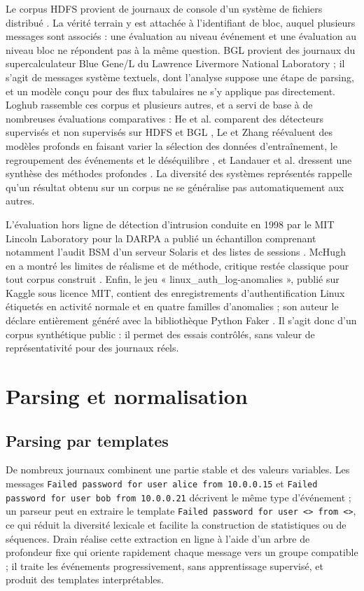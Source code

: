 Le corpus HDFS provient de journaux de console d'un système de fichiers distribué \cite{xu2009hdfs}. La vérité terrain y est attachée à l'identifiant de bloc, auquel plusieurs messages sont associés : une évaluation au niveau événement et une évaluation au niveau bloc ne répondent pas à la même question. BGL provient des journaux du supercalculateur Blue Gene/L du Lawrence Livermore National Laboratory \cite{oliner2007bgl} ; il s'agit de messages système textuels, dont l'analyse suppose une étape de parsing, et un modèle conçu pour des flux tabulaires ne s'y applique pas directement. Loghub rassemble ces corpus et plusieurs autres, et a servi de base à de nombreuses évaluations comparatives \cite{zhu2023loghub} : He et al. comparent des détecteurs supervisés et non supervisés sur HDFS et BGL \cite{he2016experience}, Le et Zhang réévaluent des modèles profonds en faisant varier la sélection des données d'entraînement, le regroupement des événements et le déséquilibre \cite{le2022logbased}, et Landauer et al. dressent une synthèse des méthodes profondes \cite{landauer2023deep}. La diversité des systèmes représentés rappelle qu'un résultat obtenu sur un corpus ne se généralise pas automatiquement aux autres.

L'évaluation hors ligne de détection d'intrusion conduite en 1998 par le MIT Lincoln Laboratory pour la DARPA a publié un échantillon comprenant notamment l'audit BSM d'un serveur Solaris et des listes de sessions \cite{lippmann2000darpa}. McHugh en a montré les limites de réalisme et de méthode, critique restée classique pour tout corpus construit \cite{mchugh2000testing}. Enfin, le jeu « linux\_auth\_log-anomalies », publié sur Kaggle sous licence MIT, contient des enregistrements d'authentification Linux étiquetés en activité normale et en quatre familles d'anomalies ; son auteur le déclare entièrement généré avec la bibliothèque Python Faker \cite{corbaci2025linuxauth}. Il s'agit donc d'un corpus synthétique public : il permet des essais contrôlés, sans valeur de représentativité pour des journaux réels.

\section{Parsing et normalisation}

\subsection{Parsing par templates}

De nombreux journaux combinent une partie stable et des valeurs variables. Les messages \texttt{Failed password for user alice from 10.0.0.15} et \texttt{Failed password for user bob from 10.0.0.21} décrivent le même type d'événement ; un parseur peut en extraire le template \texttt{Failed password for user <\*> from <\*>}, ce qui réduit la diversité lexicale et facilite la construction de statistiques ou de séquences. Drain réalise cette extraction en ligne à l'aide d'un arbre de profondeur fixe qui oriente rapidement chaque message vers un groupe compatible \cite{he2016drain} ; il traite les événements progressivement, sans apprentissage supervisé, et produit des templates interprétables.

